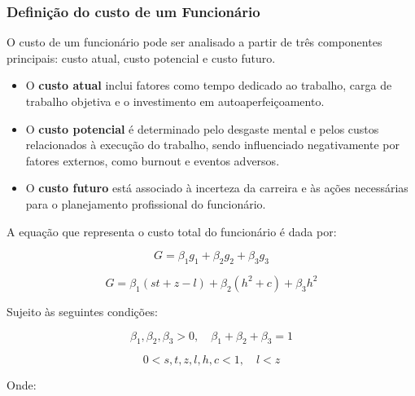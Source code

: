 \documentclass[
	article,			%
	11pt,				%
	oneside,			%
	a4paper,			%
	english,			%
	brazil,				%
	sumario=tradicional
	]{abntex2}
\begin{document}
\subsubsection{Definição do custo de um Funcionário}

O custo de um funcionário pode ser analisado a partir de três componentes principais: custo atual, custo potencial e custo futuro.

\begin{itemize}
    \item O \textbf{custo atual} inclui fatores como tempo dedicado ao trabalho, carga de trabalho objetiva e o investimento em autoaperfeiçoamento.
    \item O \textbf{custo potencial} é determinado pelo desgaste mental e pelos custos relacionados à execução do trabalho, sendo influenciado negativamente por fatores externos, como burnout e eventos adversos.
    \item O \textbf{custo futuro} está associado à incerteza da carreira e às ações necessárias para o planejamento profissional do funcionário.
\end{itemize}

A equação que representa o custo total do funcionário é dada por:

\begin{equation}
    G = \beta_1 g_1 + \beta_2 g_2 + \beta_3 g_3
\end{equation}

\begin{equation}
    G = \beta_1 (s t + z - l) + \beta_2 (h^2 + c) + \beta_3 h^2
\end{equation}

Sujeito às seguintes condições:

\begin{equation}
    \beta_1, \beta_2, \beta_3 > 0, \quad \beta_1 + \beta_2 + \beta_3 = 1
\end{equation}

\begin{equation}
    0 < s, t, z, l, h, c < 1, \quad l < z
\end{equation}

Onde:
\end{document}
